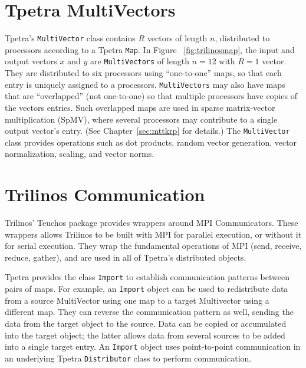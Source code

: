 \section{Tpetra MultiVectors} \label{sec:multivectors}

Tpetra's {\tt MultiVector} class contains $R$ vectors of length $n$, 
distributed to processors according to a Tpetra {\tt Map}.  In Figure
~\ref{fig:trilinosmap}, the input and output vectors $x$ and $y$ are 
{\tt MultiVectors} of length $n=12$ with $R=1$ vector.  They are distributed 
to six processors using ``one-to-one'' maps, so that each entry is uniquely
assigned to a processors.  {\tt MultiVectors} may also have maps that are 
``overlapped'' (not one-to-one) so that multiple processors have copies
of the vectors entries.  Such overlapped maps are used in sparse matrix-vector
multiplication (SpMV), where several processors may contribute to a
single output vector's entry.  (See Chapter~\ref{sec:mttkrp} for details.)
The {\tt MultiVector} class provides operations such as dot products, 
random vector generation, vector normalization, scaling, and vector norms.

\section{Trilinos Communication} \label{sec:import}

Trilinos' Teuchos package provides wrappers around MPI Communicators.
These wrappers allows Trilinos to be built with MPI for parallel execution,
or without it for serial execution.  They wrap the fundamental operations of
MPI (send, receive, reduce, gather), and are used in all of Tpetra's 
distributed objects.

Tpetra provides the class {\tt Import} to establish communication
patterns between pairs of maps.  For example, an {\tt Import} object can be used
to redistribute data from a source MultiVector using one map to a target 
Multivector using a different map.  They can reverse the communication pattern
as well, sending the data from the target object to the source.  Data can be
copied or accumulated into the target object; the latter allows data from
several sources to be added into a single target entry.  An {\tt Import} object
uses point-to-point communication in an underlying Tpetra {\tt Distributor}
class to perform communication.

